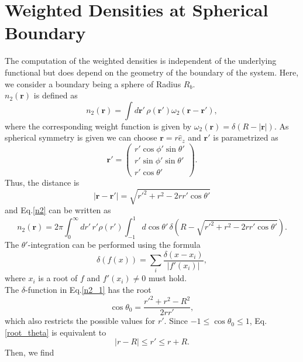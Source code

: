 \documentclass{article}
\begin{document}
\section{Weighted Densities at Spherical Boundary}
The computation of the weighted densities is independent of the underlying functional but does depend on the geometry of the boundary of the system. Here, we consider a boundary being a sphere of Radius $R_b$.\\
$n_2(\mathbf{r})$ is defined as 
\begin{equation}\label{n2}
	n_2(\mathbf{r}) = \int d\mathbf{r}'\,\rho(\mathbf{r}')\omega_2(\mathbf{r}-\mathbf{r}'),
\end{equation}
where the corresponding weight function is given by $\omega_2(\mathbf{r})=\delta(R-|\mathbf{r}|)$. As spherical symmetry is given we can choose $\mathbf{r}=r\hat{e}_z$ and $\mathbf{r}'$ is parametrized as
\begin{equation}
	\mathbf{r}' = 
	\begin{pmatrix}
	r'\cos\phi'\sin\theta'\\r'\sin\phi'\sin\theta'\\r'\cos\theta'	
	\end{pmatrix}.
\end{equation}
Thus, the distance is
\begin{equation}
	|\mathbf{r}-\mathbf{r}'| = \sqrt{r'^2+r^2-2rr'\cos\theta'}
\end{equation}
and Eq.\eqref{n2} can be written as
\begin{equation}\label{n2_1}
	n_2(\mathbf{r}) = 2\pi\int_0^\infty dr'\,r'\rho(r')\int_{-1}^1d\cos\theta'\,\delta(R-\sqrt{r'^2+r^2-2rr'\cos\theta'}).
\end{equation}
The $\theta'$-integration can be performed using the formula
\begin{equation}
	\delta(f(x)) = \sum_i \frac{\delta(x-x_i)}{|f'(x_i)|},
\end{equation}
where $x_i$ is a root of $f$ and $f'(x_i)\neq 0$ must hold.\\
The $\delta$-function in Eq.\eqref{n2_1} has the root
\begin{equation}\label{root_theta}
	\cos\theta_0 = \frac{r'^2+r^2-R^2}{2rr'},
\end{equation}
which also restricts the possible values for $r'$. Since $-1\leq\cos\theta_0\leq 1$, Eq.\eqref{root_theta} is equivalent to
\begin{equation}
	|r-R|\leq r'\leq r+R.
\end{equation}
Then, we find
\end{document}
